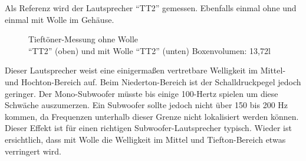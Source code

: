 \newpage
Als Referenz wird der Lautsprecher \enquote{TT2} gemessen. 
Ebenfalls einmal ohne und einmal mit Wolle im Gehäuse.
\begin{figure} [H]
	\centering
	\quad
	\caption{Tieftöner-Messung ohne Wolle\\ \enquote{TT2} (oben) und mit Wolle \enquote{TT2} (unten) Boxenvolumen: 13,72l}
	\label{fig:5.3.4.2}
\end{figure}
Dieser Lautsprecher weist eine einigermaßen vertretbare Welligkeit im Mittel- und Hochton-Bereich auf.
Beim Niederton-Bereich ist der Schalldruckpegel jedoch geringer.
Der Mono-Subwoofer müsste bis einige 100-Hertz spielen um diese Schwäche auszumerzen.
Ein Subwoofer sollte jedoch nicht über 150 bis 200 Hz kommen, da Frequenzen unterhalb dieser Grenze nicht lokalisiert werden können.
Dieser Effekt ist für einen richtigen Subwoofer-Lautsprecher typisch.
Wieder ist ersichtlich, dass mit Wolle die Welligkeit im Mittel und Tiefton-Bereich etwas verringert wird.

